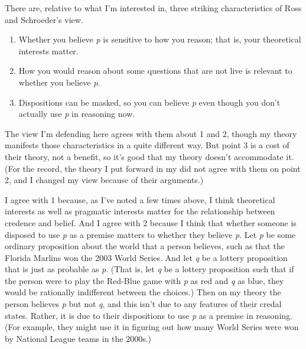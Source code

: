 \documentclass[11pt,]{book}
\providecommand{\tightlist}{%
  \setlength{\itemsep}{0pt}\setlength{\parskip}{0pt}}
\begin{document}
There are, relative to what I'm interested in, three striking characteristics of Ross and Schroeder's view.

\begin{enumerate}
\def\labelenumi{\arabic{enumi}.}
\tightlist
\item
  Whether you believe \emph{p} is sensitive to how you reason; that is, your theoretical interests matter.
\item
  How you would reason about some questions that are not live is relevant to whether you believe \emph{p}.
\item
  Dispositions can be masked, so you can believe \emph{p} even though you don't actually use \emph{p} in reasoning now.
\end{enumerate}

The view I'm defending here agrees with them about 1 and 2, though my theory manifests those characteristics in a quite different way. But point 3 is a cost of their theory, not a benefit, so it's good that my theory doesn't accommodate it. (For the record, the theory I put forward in my \citeyearpar{Weatherson2005-WEACWD} did not agree with them on point 2, and I changed my view because of their arguments.)

I agree with 1 because, as I've noted a few times above, I think theoretical interests as well as pragmatic interests matter for the relationship between credence and belief. And I agree with 2 because I think that whether someone is disposed to use \emph{p} as a premise matters to whether they believe \emph{p}. Let \emph{p} be some ordinary proposition about the world that a person believes, such as that the Florida Marlins won the 2003 World Series. And let \emph{q} be a lottery proposition that is just as probable as \emph{p}. (That is, let \emph{q} be a lottery proposition such that if the person were to play the Red-Blue game with \emph{p} as red and \emph{q} as blue, they would be rationally indifferent between the choices.) Then on my theory the person believes \emph{p} but not \emph{q}, and this isn't due to any features of their credal states. Rather, it is due to their dispositions to use \emph{p} as a premise in reasoning. (For example, they might use it in figuring out how many World Series were won by National League teams in the 2000s.)
\end{document}
